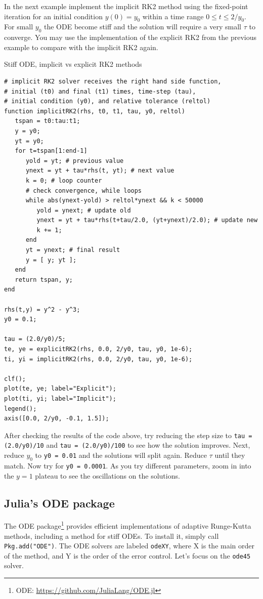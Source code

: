 In the next example implement the implicit RK2 method using the fixed-point iteration for an initial condition $y(0) = y_0$ within a time range $0 \leq t \leq 2/y_0$. For small $y_0$ the ODE become stiff and the solution will require a very small $\tau$ to converge. You may use the implementation of the explicit RK2 from the previous example to compare with the implicit RK2 again.

\begin{example}{Stiff ODE, implicit vs explicit RK2 methods}
\label{ex:stiff2}
\begin{verbatim}
# implicit RK2 solver receives the right hand side function,
# initial (t0) and final (t1) times, time-step (tau),
# initial condition (y0), and relative tolerance (reltol)
function implicitRK2(rhs, t0, t1, tau, y0, reltol)
   tspan = t0:tau:t1;
   y = y0;
   yt = y0;
   for t=tspan[1:end-1]
      yold = yt; # previous value
      ynext = yt + tau*rhs(t, yt); # next value
      k = 0; # loop counter
      # check convergence, while loops
      while abs(ynext-yold) > reltol*ynext && k < 50000 
         yold = ynext; # update old
         ynext = yt + tau*rhs(t+tau/2.0, (yt+ynext)/2.0); # update new
         k += 1;
      end
      yt = ynext; # final result
      y = [ y; yt ]; 
   end
   return tspan, y;
end

rhs(t,y) = y^2 - y^3;
y0 = 0.1;

tau = (2.0/y0)/5;
te, ye = explicitRK2(rhs, 0.0, 2/y0, tau, y0, 1e-6);
ti, yi = implicitRK2(rhs, 0.0, 2/y0, tau, y0, 1e-6);

clf();
plot(te, ye; label="Explicit");
plot(ti, yi; label="Implicit");
legend();
axis([0.0, 2/y0, -0.1, 1.5]);
\end{verbatim}
\end{example}

After checking the results of the code above, try reducing the step size to \texttt{tau = (2.0/y0)/10} and \texttt{tau = (2.0/y0)/100} to see how the solution improves. Next, reduce $y_0$ to \texttt{y0 = 0.01} and the solutions will split again. Reduce $\tau$ until they match. Now try for \texttt{y0 = 0.0001}. As you try different parameters, zoom in into the $y=1$ plateau to see the oscillations on the solutions.

\subsection{Julia's ODE package}

The ODE package\footnote{ODE: \url{https://github.com/JuliaLang/ODE.jl}} provides efficient implementations of adaptive Runge-Kutta methods, including a method for stiff ODEs. To install it, simply call \texttt{Pkg.add("ODE")}. The ODE solvers are labeled \texttt{odeXY}, where X is the main order of the method, and Y is the order of the error control. Let's focus on the \texttt{ode45} solver.

